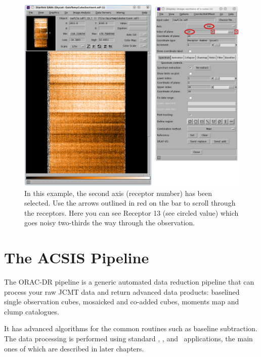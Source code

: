 \documentclass[11pt,oneside,chapters]{starlink}
\begin{document}
\begin{figure}[h!]
\begin{center}
\includegraphics[width=0.9\linewidth]{sc20_badreceptor2}
\caption[Identifying bad receptors in the raw data: second method.]{\label{fig:maskreceptor2}
  In this example, the second axis (receptor number) has been
  selected. Use the arrows outlined in red on the  bar to scroll through the receptors. Here you can see
  Receptor 13 (see circled  value) which
  goes noisy two-thirds the way through the observation.}
\end{center}
\end{figure}


\newpage
\chapter{The ACSIS Pipeline}
\label{sec:pipe}

The ORAC-DR pipeline \cite{oracdr} is a generic automated data
reduction pipeline that can process your raw JCMT data and return
advanced data products: baselined single observation cubes, mosaicked
and co-added cubes, moments map and clump catalogues.
\cite{heterodyne_pipeline}

It has advanced algorithms for the common routines such as baseline
subtraction. The data processing is performed using standard \Kappa,
\smurf, and \cupid\ applications, the main ones of which are
described in later chapters.
\end{document}
